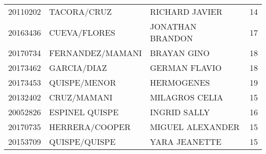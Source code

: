 \begin{table}[H]
\begin{tabular}{llll}
		20110202 & TACORA/CRUZ         & RICHARD JAVIER     & 14  \\
		20163436 & CUEVA/FLORES        & JONATHAN BRANDON   & 17  \\
		20170734 & FERNANDEZ/MAMANI    & BRAYAN GINO        & 18  \\
		20173462 & GARCIA/DIAZ         & GERMAN FLAVIO      & 18  \\
		20173453 & QUISPE/MENOR        & HERMOGENES         & 19  \\
		20132402 & CRUZ/MAMANI         & MILAGROS CELIA     & 15  \\
		20052826 & ESPINEL QUISPE      & INGRID SALLY       & 16  \\
		20170735 & HERRERA/COOPER      & MIGUEL ALEXANDER   & 15  \\
		20153709 & QUISPE/QUISPE       & YARA JEANETTE      & 15 
	\end{tabular}
\end{table}

